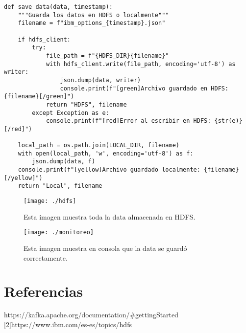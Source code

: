 \documentclass{article}
\begin{document}
	\begin{lstlisting}[style=python]
def save_data(data, timestamp):
	"""Guarda los datos en HDFS o localmente"""
	filename = f"ibm_options_{timestamp}.json"
			
	if hdfs_client:
	  	try:
			file_path = f"{HDFS_DIR}{filename}"
			with hdfs_client.write(file_path, encoding='utf-8') as writer:
				json.dump(data, writer)
				console.print(f"[green]Archivo guardado en HDFS: {filename}[/green]")
			return "HDFS", filename
		except Exception as e:
			console.print(f"[red]Error al escribir en HDFS: {str(e)}[/red]")
			
	local_path = os.path.join(LOCAL_DIR, filename)
	with open(local_path, 'w', encoding='utf-8') as f:
		json.dump(data, f)
	console.print(f"[yellow]Archivo guardado localmente: {filename}[/yellow]")
	return "Local", filename
		\end{lstlisting}
		
		\begin{figure}[h]
			\centering
			\texttt{[image: ./hdfs]}
			\caption{Esta imagen muestra toda la data almacenada en HDFS.}
			\label{fig:mi_imagen}
		\end{figure}
	\begin{figure}[h]
		\centering
		\texttt{[image: ./monitoreo]}
		\caption{Esta imagen muestra en consola que la data se guardó correctamente.}
		\label{fig:mi_imagen}
	\end{figure}
	
	\section{Referencias}
	
	\begin{flushleft}
		[1]https://kafka.apache.org/documentation/\#gettingStarted\\
	
	[2]https://www.ibm.com/es-es/topics/hdfs
	\end{flushleft}
\end{document}
